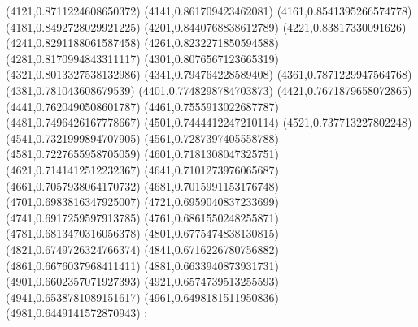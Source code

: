 {(4121,0.8711224608650372)
(4141,0.861709423462081)
(4161,0.8541395266574778)
(4181,0.8492728029921225)
(4201,0.8440768838612789)
(4221,0.83817330091626)
(4241,0.8291188061587458)
(4261,0.8232271850594588)
(4281,0.8170994843311117)
(4301,0.8076567123665319)
(4321,0.8013327538132986)
(4341,0.794764228589408)
(4361,0.7871229947564768)
(4381,0.781043608679539)
(4401,0.7748298784703873)
(4421,0.7671879658072865)
(4441,0.7620490508601787)
(4461,0.7555913022687787)
(4481,0.7496426167778667)
(4501,0.7444412247210114)
(4521,0.737713227802248)
(4541,0.7321999894707905)
(4561,0.7287397405558788)
(4581,0.7227655958705059)
(4601,0.7181308047325751)
(4621,0.7141412512232367)
(4641,0.7101273976065687)
(4661,0.7057938064170732)
(4681,0.7015991153176748)
(4701,0.6983816347925007)
(4721,0.6959040837233699)
(4741,0.6917259597913785)
(4761,0.6861550248255871)
(4781,0.6813470316056378)
(4801,0.6775474838130815)
(4821,0.6749726324766374)
(4841,0.6716226780756882)
(4861,0.6676037968411411)
(4881,0.6633940873931731)
(4901,0.6602357071927393)
(4921,0.6574739513255593)
(4941,0.6538781089151617)
(4961,0.6498181511950836)
(4981,0.6449141572870943)
};
